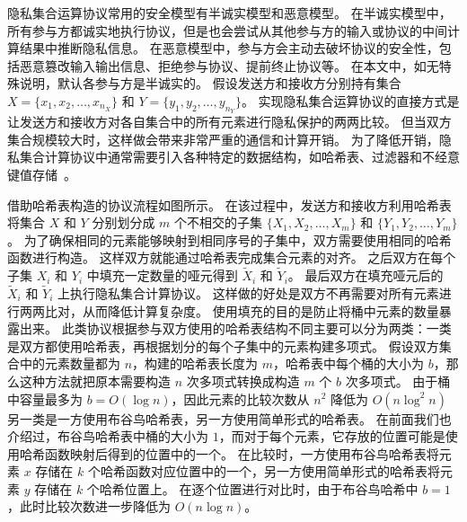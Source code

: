 隐私集合运算协议常用的安全模型有半诚实模型和恶意模型。
在半诚实模型中，所有参与方都诚实地执行协议，但是也会尝试从其他参与方的输入或协议的中间计算结果中推断隐私信息。
在恶意模型中，参与方会主动去破坏协议的安全性，包括恶意篡改输入输出信息、拒绝参与协议、提前终止协议等。
在本文中，如无特殊说明，默认各参与方是半诚实的。
假设发送方和接收方分别持有集合 $X=\{x_1, x_2, \dots, x_{n_X}\}$ 和 $Y=\{y_1, y_2, \dots, y_{n_Y}\}$。
实现隐私集合运算协议的直接方式是让发送方和接收方对各自集合中的所有元素进行隐私保护的两两比较。
但当双方集合规模较大时，这样做会带来非常严重的通信和计算开销。
为了降低开销，隐私集合计算协议中通常需要引入各种特定的数据结构，如哈希表、过滤器和不经意键值存储~\cite{zhang2024survey}。

借助哈希表构造的协议流程如图所示。
在该过程中，发送方和接收方利用哈希表将集合 $X$ 和 $Y$ 分别划分成 $m$ 个不相交的子集 $\{X_1, X_2, \dots, X_m\}$ 和 $\{Y_1, Y_2, \dots, Y_m\}$。
为了确保相同的元素能够映射到相同序号的子集中，双方需要使用相同的哈希函数进行构造。
这样双方就能通过哈希表完成集合元素的对齐。
之后双方在每个子集 $X_i$ 和 $Y_i$ 中填充一定数量的哑元得到 $\tilde{X}_i$ 和 $\tilde{Y}_i$。
最后双方在填充哑元后的 $\tilde{X}_i$ 和 $\tilde{Y}_i$ 上执行隐私集合计算协议。
这样做的好处是双方不再需要对所有元素进行两两比对，从而降低计算复杂度。
使用填充的目的是防止将桶中元素的数量暴露出来。
此类协议根据参与双方使用的哈希表结构不同主要可以分为两类：一类是双方都使用哈希表，再根据划分的每个子集中的元素构建多项式。
假设双方集合中的元素数量都为 $n$，构建的哈希表长度为 $m$，哈希表中每个桶的大小为 $b$，那么这种方法就把原本需要构造 $n$ 次多项式转换成构造 $m$ 个 $b$ 次多项式。
由于桶中容量最多为 $b=O(\log n)$，因此元素的比较次数从 $n^2$ 降低为 $O(n\log^2n)$
另一类是一方使用布谷鸟哈希表，另一方使用简单形式的哈希表。
在前面我们也介绍过，布谷鸟哈希表中桶的大小为 $1$，而对于每个元素，它存放的位置可能是使用哈希函数映射后得到的位置中的一个。
在比较时，一方使用布谷鸟哈希表将元素 $x$ 存储在 $k$ 个哈希函数对应位置中的一个，另一方使用简单形式的哈希表将元素 $y$ 存储在 $k$ 个哈希位置上。
在逐个位置进行对比时，由于布谷鸟哈希中 $b=1$，此时比较次数进一步降低为 $O(n\log n)$。

